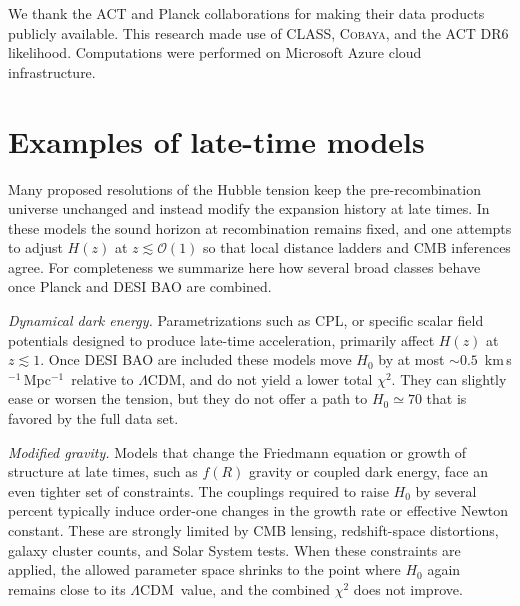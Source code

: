\documentclass[twocolumn,showpacs,preprintnumbers,amsmath,amssymb,prd]{revtex4-2}
\newcommand{\lcdm}{$\Lambda$CDM}
\newcommand{\kms}{km\,s$^{-1}$\,Mpc$^{-1}$}
\begin{document}
\begin{acknowledgments}
We thank the ACT and Planck collaborations for making their data products 
publicly available. This research made use of \textsc{CLASS}, \textsc{Cobaya}, 
and the ACT DR6 likelihood. Computations were performed on Microsoft Azure 
cloud infrastructure.
\end{acknowledgments}



\appendix

\section{Examples of late-time models}
\label{app:latetime}

Many proposed resolutions of the Hubble tension keep the pre-recombination universe 
unchanged and instead modify the expansion history at late times. In these models 
the sound horizon at recombination remains fixed, and one attempts to adjust $H(z)$ 
at $z \lesssim \mathcal{O}(1)$ so that local distance ladders and CMB inferences agree. 
For completeness we summarize here how several broad classes behave once Planck and 
DESI BAO are combined.

\emph{Dynamical dark energy.} Parametrizations such as CPL, or specific scalar 
field potentials designed to produce late-time acceleration, primarily affect 
$H(z)$ at $z \lesssim 1$. Once DESI BAO 
are included these models move $H_0$ by at most $\sim 0.5$~\kms\ 
relative to \lcdm, and do not yield a lower total $\chi^2$. They can slightly ease 
or worsen the tension, but they do not offer a path to $H_0 \simeq 70$ that is 
favored by the full data set.

\emph{Modified gravity.} Models that change the Friedmann equation or growth of 
structure at late times, such as $f(R)$ gravity or coupled dark energy, face an 
even tighter set of constraints. The couplings required to raise $H_0$ by several 
percent typically induce order-one changes in the growth rate or effective Newton 
constant. These are strongly limited by CMB lensing, redshift-space distortions, 
galaxy cluster counts, and Solar System tests. When these constraints are applied, 
the allowed parameter space shrinks to the point where $H_0$ again remains close 
to its \lcdm\ value, and the combined $\chi^2$ does not improve.
\end{document}
